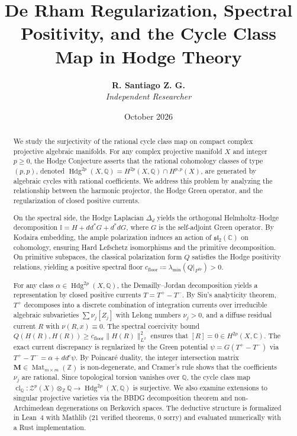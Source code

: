 \documentclass[11pt,a4paper]{article}
\title{\textbf{De Rham Regularization, Spectral Positivity, and the Cycle Class Map in Hodge Theory}}
\author{\textbf{R. Santiago Z. G.}\\
\textit{Independent Researcher}}
\date{October 2026}
\theoremstyle{definition}
\theoremstyle{plain}
\DeclareMathOperator{\Hdg}{Hdg}
\DeclareMathOperator{\cl}{cl}
\begin{document}
\maketitle

\begin{abstract}
We study the surjectivity of the rational cycle class map on compact complex projective algebraic manifolds. For any complex projective manifold $X$ and integer $p \ge 0$, the Hodge Conjecture asserts that the rational cohomology classes of type $(p,p)$, denoted $\Hdg^{2p}(X, \mathbb{Q}) = H^{2p}(X, \mathbb{Q}) \cap H^{p,p}(X)$, are generated by algebraic cycles with rational coefficients. We address this problem by analyzing the relationship between the harmonic projector, the Hodge Green operator, and the regularization of closed positive currents.

On the spectral side, the Hodge Laplacian $\Delta_d$ yields the orthogonal Helmholtz--Hodge decomposition $\mathbb{I} = H + dd^* G + d^*d G$, where $G$ is the self-adjoint Green operator. By Kodaira embedding, the ample polarization induces an action of $\mathfrak{sl}_2(\mathbb{C})$ on cohomology, ensuring Hard Lefschetz isomorphisms and the primitive decomposition. On primitive subspaces, the classical polarization form $Q$ satisfies the Hodge positivity relations, yielding a positive spectral floor $c_{\mathrm{floor}} \coloneqq \lambda_{\min}(Q|_{P^{2p}}) > 0$.

For any class $\alpha \in \Hdg^{2p}(X, \mathbb{Q})$, the Demailly--Jordan decomposition yields a representation by closed positive currents $T = T^+ - T^-$. By Siu's analyticity theorem, $T^+$ decomposes into a discrete combination of integration currents over irreducible algebraic subvarieties $\sum \nu_j [Z_j]$ with Lelong numbers $\nu_j > 0$, and a diffuse residual current $R$ with $\nu(R, x) \equiv 0$. The spectral coercivity bound $Q(H(R), H(R)) \ge c_{\mathrm{floor}} \|H(R)\|_{L^2}^2$ ensures that $[R] = 0 \in H^{2p}(X, \mathbb{C})$. The exact current discrepancy is regularized by the Green potential $\psi = G(T^+ - T^-)$ via $T^+ - T^- = \alpha + dd^c \psi$. By Poincaré duality, the integer intersection matrix $\mathbf{M} \in \operatorname{Mat}_{m \times m}(\mathbb{Z})$ is non-degenerate, and Cramer's rule shows that the coefficients $\nu_j$ are rational. Since topological torsion vanishes over $\mathbb{Q}$, the cycle class map $\cl_{\mathbb{Q}}: \mathcal{Z}^p(X) \otimes_{\mathbb{Z}} \mathbb{Q} \to \Hdg^{2p}(X, \mathbb{Q})$ is surjective. We also examine extensions to singular projective varieties via the BBDG decomposition theorem and non-Archimedean degenerations on Berkovich spaces. The deductive structure is formalized in Lean~4 with Mathlib (21 verified theorems, 0 sorry) and evaluated numerically with a Rust implementation.
\end{abstract}
\end{document}

